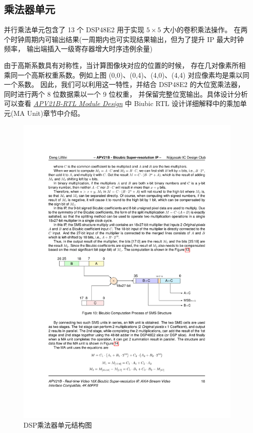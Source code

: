 \documentclass[12pt, a4paper, oneside]{ctexbook}
\begin{document}
	\subsection{乘法器单元} \label{mul_unit}
	并行乘法单元包含了 13 个 DSP48E2 用于实现 $5\times5$ 大小的卷积乘法操作。
	在两个时钟周期内可输出结果(一周期内也可实现结果输出，但为了提升 IP 最大时钟频率，
	输出端插入一级寄存器增大时序违例余量)\par 由于高斯系数具有对称性，当计算图像块对应的位置的时候，
	存在几对像素所相乘同一个高斯权重系数。例如上图 (0,0)、(0,4)、(4,0)、(4,4) 对应像素均是乘以同一个系数。
	因此，我们可以利用这一特性，并结合 DSP48E2 的大位宽乘法器，同时进行两个 8 位数据乘以一个 9 位权重，
	并保留完整位宽输出。具体设计分析可以查看 \href{./ref/APV21B_RTL_Module_Design.pdf}{\textit{APV21B-RTL Module Design}} 中 Biubic RTL 设计详细解释中的乘加单元(MA Unit)章节中介绍。%
		\begin{figure}[h]
			\centering
			\includegraphics[scale=1]{pic/mul_unit}
			\caption{DSP乘法器单元结构图}
			\label{fig:mulunit}
		\end{figure}
\end{document}
